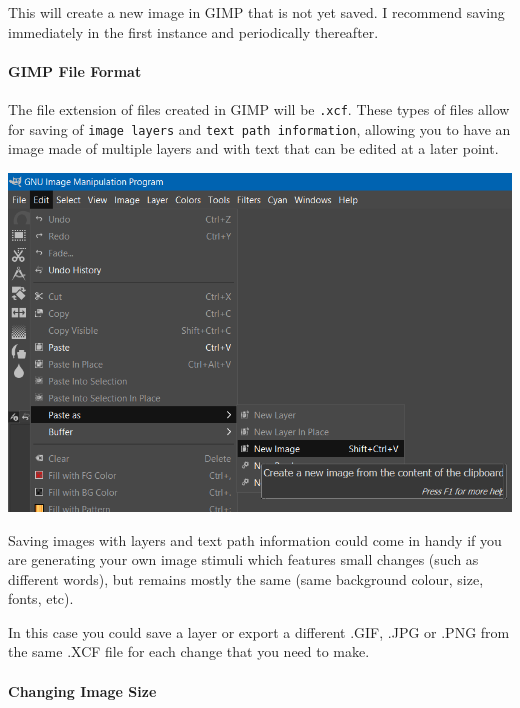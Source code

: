 \documentclass[]{book}
\let\oldparagraph\paragraph
\renewcommand{\paragraph}[1]{\oldparagraph{#1}\mbox{}}
\begin{document}
This will create a new image in GIMP that is not yet saved. I recommend saving immediately in the first instance and periodically thereafter.

\hypertarget{gimp-file-format}{%
\paragraph{GIMP File Format}\label{gimp-file-format}}

The file extension of files created in GIMP will be \texttt{.xcf}. These types of files allow for saving of \texttt{image\ layers} and \texttt{text\ path\ information}, allowing you to have an image made of multiple layers and with text that can be edited at a later point.

\includegraphics{images/screenshots/paste_as_new_gimp.png}

\begin{info}
Saving images with layers and text path information could come in handy
if you are generating your own image stimuli which features small
changes (such as different words), but remains mostly the same (same
background colour, size, fonts, etc).

In this case you could save a layer or export a different .GIF, .JPG or
.PNG from the same .XCF file for each change that you need to make.
\end{info}

\hypertarget{changing-image-size}{%
\paragraph{Changing Image Size}\label{changing-image-size}}
\end{document}
